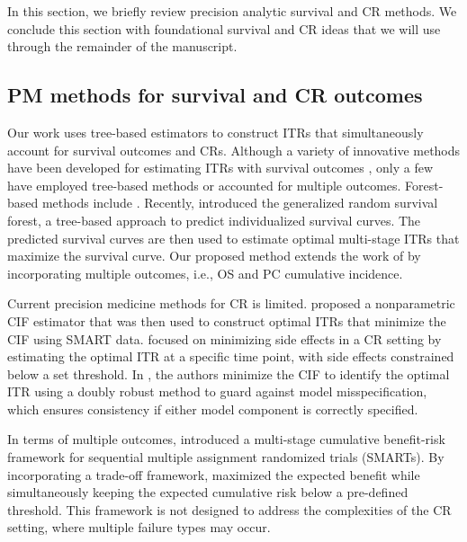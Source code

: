 In this section, we briefly review precision analytic survival and CR methods. We conclude this section with foundational survival and CR ideas that we will use through the remainder of the manuscript. 

\subsection{PM methods for survival and CR outcomes}
Our work uses tree-based estimators to construct ITRs that simultaneously account for survival outcomes and CRs. Although a variety of innovative methods have been developed for estimating ITRs with survival outcomes \citep{zhao_doubly_2015, hager_optimal_2018, wu_matched_2020, zhong_survival_2021,  schrod_bites_2022, choi_accountable_2023, bakoyannis_estimating_2023}, only a few have employed tree-based methods or accounted for multiple outcomes. 
Forest-based methods include \cite{cui_tree_2017, zhu_tree-based_2018, doubleday_risk_2022, devaux_random_2023}.
Recently, \cite{cho_multi-stage_2023} introduced the generalized random survival forest, a tree-based approach to predict individualized survival curves. The predicted survival curves are then used to estimate optimal multi-stage ITRs that maximize the survival curve. Our proposed method extends the work of \cite{cho_multi-stage_2023} by incorporating multiple outcomes, i.e., OS and PC cumulative incidence. 

Current precision medicine methods for CR is limited. \cite{yavuz_estimating_2018} proposed a nonparametric CIF estimator that was then used to construct optimal ITRs that minimize the CIF using SMART data. \cite{zhou_restricted_2021} focused on minimizing side effects in a CR setting by estimating the optimal ITR at a specific time point, with side effects constrained below a set threshold. In \cite{he_optimal_2021}, 
the authors minimize the CIF to identify the optimal ITR using a doubly robust method to guard against model misspecification, which ensures consistency if either model component is correctly specified. 

In terms of multiple outcomes, \cite{liu_estimation_2023} introduced a multi-stage cumulative benefit-risk framework for sequential multiple assignment randomized trials (SMARTs). By incorporating a trade-off framework, \cite{liu_estimation_2023} maximized the expected benefit while simultaneously keeping the expected cumulative risk below a pre-defined threshold. This framework is not designed to address the complexities of the CR setting, where multiple failure types may occur. 

